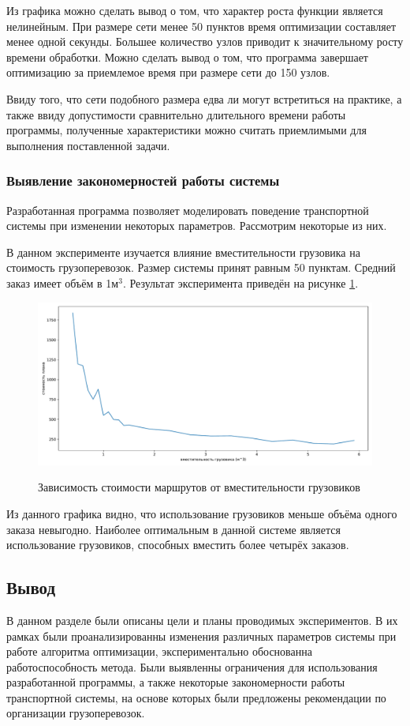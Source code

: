 Из графика можно сделать вывод о том, что характер роста функции является нелинейным. При размере сети менее 50 пунктов время оптимизации составляет менее одной секунды. Большее количество узлов приводит к значительному росту времени обработки. Можно сделать вывод о том, что программа завершает оптимизацию за приемлемое время при размере сети до 150 узлов. 

Ввиду того, что сети подобного размера едва ли могут встретиться на практике, а также ввиду допустимости сравнительно длительного времени работы программы, полученные характеристики можно считать приемлимыми для выполнения поставленной задачи.

\subsubsection{Выявление закономерностей работы системы}
Разработанная программа позволяет моделировать поведение транспортной системы при изменении некоторых параметров. Рассмотрим некоторые из них.

В данном эксперименте изучается влияние вместительности грузовика на стоимость грузоперевозок. Размер системы принят равным 50 пунктам. Средний заказ имеет объём в 1м$^3$. Результат эксперимента приведён на рисунке \ref{exp:truck_vol}.

\begin{figure}[h!]
	\begin{center}
		{\includegraphics[scale=0.5, angle=0, page=1]{research/truck_vol.pdf}}
		\caption{Зависимость стоимости маршрутов от вместительности грузовиков}
		\label{exp:truck_vol}
	\end{center}
\end{figure}

Из данного графика видно, что использование грузовиков меньше объёма одного заказа невыгодно. Наиболее оптимальным в данной системе является использование грузовиков, способных вместить более четырёх заказов.


\subsection*{Вывод}
В данном разделе были описаны цели и планы проводимых экспериментов. В их рамках были проанализированны изменения различных параметров системы при работе алгоритма оптимизации, экспериментально обоснованна работоспособность метода. Были выявленны ограничения для использования разработанной программы, а также некоторые закономерности работы транспортной системы, на основе которых были предложены рекомендации по организации грузоперевозок. 

\pagebreak
